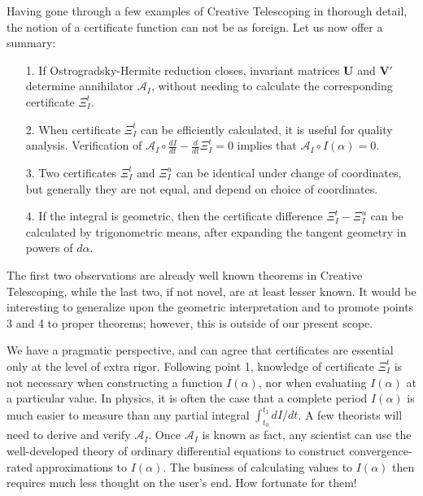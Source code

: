 \documentclass[nofootinbib,preprint]{revtex4-1}
\begin{document}
Having gone through a few examples of Creative Telescoping in thorough
detail, the notion of a certificate function can not be as foreign. Let
us now offer a summary:
\begin{itemize}
 \item [1. ] If Ostrogradsky-Hermite reduction closes, invariant matrices
 $\mathbf{U}$ and $\mathbf{V'}$  determine annihilator $\mathcal{A}_I$,
 without needing to calculate the corresponding certificate $\Xi_I^t$.
 \item [2. ] When certificate $\Xi_I^t$ can be efficiently calculated, 
 it is useful for quality analysis. Verification of 
 $\mathcal{A}_I \circ \frac{dI}{dt} - \frac{d}{dt}\Xi_I^t=0$ implies
 that $\mathcal{A}_I \circ I(\alpha) = 0$.
\item [3. ] Two certificates $\Xi_I^t$  and $\Xi_I^u$ can be identical 
 under change of coordinates, but generally they are not equal, and depend 
 on choice of coordinates.
\item [4. ] If the integral is geometric, then the certificate difference
 $\Xi_I^t-\Xi_I^u$ can be calculated by trigonometric means, after expanding 
 the tangent geometry in powers of $d\alpha$.
\end{itemize}
The first two observations are already well known theorems in Creative Telescoping,
while the last two, if not novel, are at least lesser known. It would be interesting
to generalize upon the geometric interpretation and to promote points 3 and 4 to 
proper theorems; however, this is outside of our present scope. 

We have a pragmatic perspective, and can agree that certificates are essential 
only at the level of extra rigor. Following point 1, knowledge of certificate 
$\Xi_I^t$ is not necessary when constructing a function $I(\alpha)$, nor 
when evaluating $I(\alpha)$ at a particular value. In physics, it is 
often the case that a complete period $I(\alpha)$ is much easier to 
measure than any partial integral $\int_{t_0}^{t_1} dI/dt$. A few 
theorists will need to derive and verify $\mathcal{A}_I$. Once 
$\mathcal{A}_I$ is known as fact, any scientist can use the 
well-developed theory of ordinary differential equations to 
construct convergence-rated approximations to $I(\alpha)$. 
The business of calculating values to $I(\alpha)$ then requires 
much less thought on the user's end. How fortunate for them! 
\end{document}

